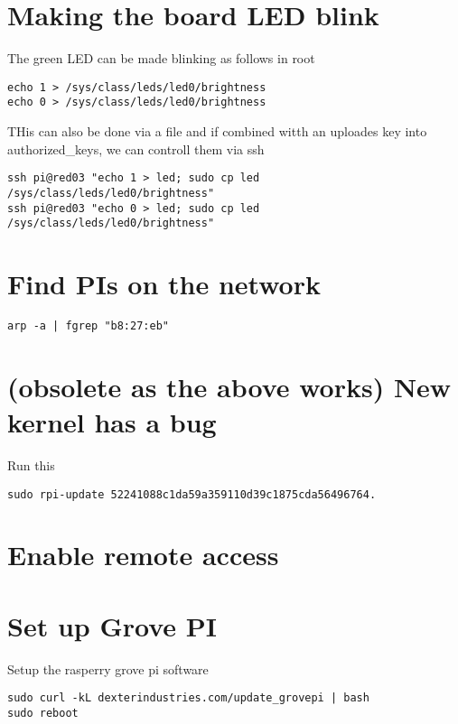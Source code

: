 \section{Making the board LED blink}

The green LED can be made blinking as follows in root

\begin{lstlisting}
echo 1 > /sys/class/leds/led0/brightness
echo 0 > /sys/class/leds/led0/brightness
\end{lstlisting}

THis can also be done via a file and if combined witth an uploades key
into authorized\_keys, we can controll them via ssh

\begin{lstlisting}
ssh pi@red03 "echo 1 > led; sudo cp led /sys/class/leds/led0/brightness"        
ssh pi@red03 "echo 0 > led; sudo cp led /sys/class/leds/led0/brightness"
\end{lstlisting}

\section{Find PIs on the network}

\begin{lstlisting}
arp -a | fgrep "b8:27:eb"
\end{lstlisting}

\section{(obsolete as the above works) New kernel has a bug}

Run this

\begin{lstlisting}
sudo rpi-update 52241088c1da59a359110d39c1875cda56496764.
\end{lstlisting}

\section{Enable remote access}

\section{Set up Grove PI}

Setup the rasperry grove pi software

\begin{lstlisting}
sudo curl -kL dexterindustries.com/update_grovepi | bash
sudo reboot
\end{lstlisting}

